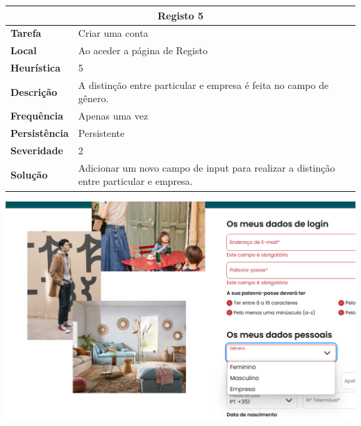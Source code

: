 \documentclass[a4paper,12pt]{article}
\begin{document}
\begin{center}
\newpage
    \begin{table}[h!]
        \centering
        \begin{tabular}{|m{3cm}|m{12cm}|}
        \hline
        \multicolumn{2}{|c|}{\textbf{Registo 5}} \\ \hline
        \textbf{Tarefa}       & Criar uma conta\\ \hline
        \textbf{Local}        & Ao aceder a página de Registo \\ \hline
        \textbf{Heurística}   & 5  \\ \hline
        \textbf{Descrição}    & A distinção entre particular e empresa é feita no campo de gênero. \\ \hline
        \textbf{Frequência}   & Apenas uma vez \\ \hline
        \textbf{Persistência} & Persistente \\ \hline
        \textbf{Severidade}   & 2 \\ \hline
        \textbf{Solução}      & Adicionar um novo campo de input para realizar a distinção entre particular e empresa. \\ \hline
        \end{tabular}
    \end{table}
    
    \vspace{0.5cm}
    \includegraphics[width=\textwidth, keepaspectratio]{heuristics/04genero_registo.png}


\end{center}
\end{document}
